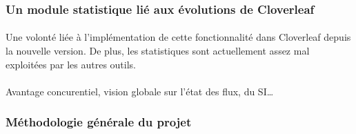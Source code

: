		\subsubsection{Un module statistique lié aux évolutions de Cloverleaf}
			\paragraph{}%
			Une volonté liée à l'implémentation de cette fonctionnalité dans Cloverleaf depuis 
			la nouvelle version. De plus, les statistiques sont actuellement assez mal 
			exploitées par les autres outils.
			
			\paragraph{}%
			Avantage concurentiel, vision globale sur l'état des flux, du SI\ldots
			
		\subsubsection{Méthodologie générale du projet}
			\paragraph{}%
			
			\paragraph{}%
			
			\paragraph{}%
			